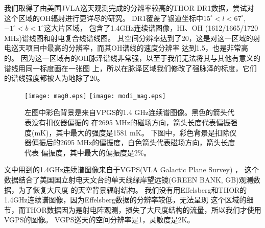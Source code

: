 我们取得了由美国JVLA巡天观测完成的分辨率较高的THOR DR1数据\citep{Beuther2016}，尝试对
这个区域的OH辐射进行更详尽的研究。
DR1覆盖了银道坐标中$15^{\circ}<l<67^{\circ}$,$-1^{\circ}<b<1^{\circ}$这大片区域，
包含了1.4GHz连续谱图像，HI、OH (1612/1665/1720 MHz)谱线图和射电复合线谱线图。
其空间分辨率达到了20\as，这是对这一区域的射电巡天项目中最高的分辨率，而其OH谱线的速度分辨率
达到1.5\kms，也是非常高的。
因为这一区域有的OH脉泽谱线非常强，以至于我们无法将其与其他有意义的谱线用同一标度画在一张图
上，所以在脉泽区域我们修改了强脉泽的标度，它们的谱线强度都被人为地除了20。

\begin{figure*}
   \centering
   \texttt{[image: mag0.eps]}
   \texttt{[image: modi\_mag.eps]}
   \caption{左图中彩色背景是来自VPGS的1.4 GHz连续谱图像。黑色的箭头代表没有扣仪器偏振的
   在2695 MHz的磁场方向，箭头长度代表偏振强度(mK)，其中最大的强度是1581 mK。
   下图中，彩色背景是扣除仪器偏振后的2695 MHz的偏振度，白色箭头代表磁场方向，箭头长度代表
   偏振度，其中最大的偏振度是$2\%$。
   }
\label{fig:mag}
\end{figure*}

文中用到的1.4GHz连续谱图像来自于VGPS(VLA Galactic Plane Survey) \citep{Stil2006}，
这个数据结合了美国国立射电天文台的单天线绿岸望远镜(GREEN BANK, GB)观测数据，为了恢复大尺度
的天空背景辐射结构。
我们没有用Effelsberg和THOR的1.4GHz连续谱图像，因为Effelsberg数据的分辨率较低，无法呈现
这个区域的细节，而THOR数据因为是射电阵观测，损失了大尺度结构的流量，所以我们才使用VGPS的图像。
VGPS巡天的空间分辨率是1\am，灵敏度是2K。


